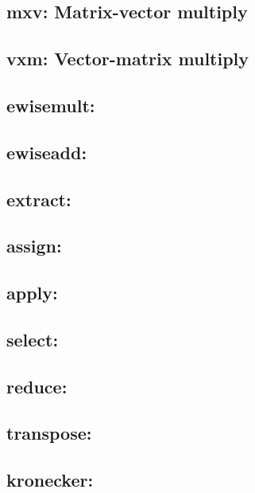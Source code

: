\subsection{{\sf mxv}: Matrix-vector multiply}

\subsection{{\sf vxm}: Vector-matrix multiply}


\subsection{{\sf ewisemult}: }

\subsection{{\sf ewiseadd}: }

\subsection{{\sf extract}: }

\subsection{{\sf assign}: }

\subsection{{\sf apply}: }

\subsection{{\sf select}: }

\subsection{{\sf reduce}: }

\subsection{{\sf transpose}: }

\subsection{{\sf kronecker}: }
